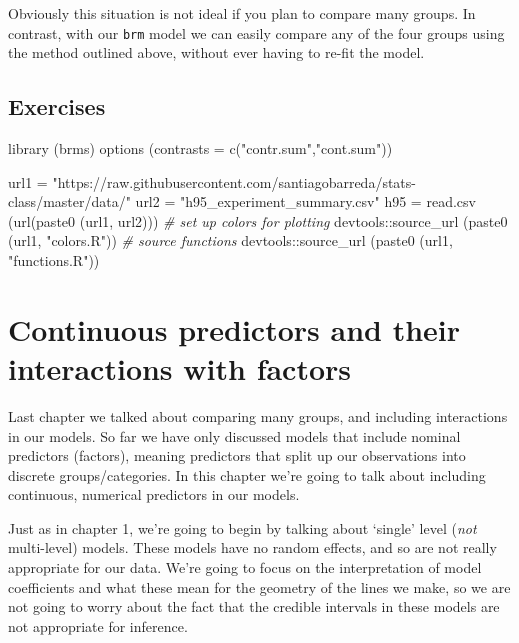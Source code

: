 \documentclass[
]{book}
\newenvironment{Shaded}{\begin{snugshade}}{\end{snugshade}}
\newcommand{\AttributeTok}[1]{\textcolor[rgb]{0.77,0.63,0.00}{#1}}
\newcommand{\CommentTok}[1]{\textcolor[rgb]{0.56,0.35,0.01}{\textit{#1}}}
\newcommand{\FunctionTok}[1]{\textcolor[rgb]{0.00,0.00,0.00}{#1}}
\newcommand{\NormalTok}[1]{#1}
\newcommand{\OtherTok}[1]{\textcolor[rgb]{0.56,0.35,0.01}{#1}}
\newcommand{\SpecialCharTok}[1]{\textcolor[rgb]{0.00,0.00,0.00}{#1}}
\newcommand{\StringTok}[1]{\textcolor[rgb]{0.31,0.60,0.02}{#1}}
\begin{document}
Obviously this situation is not ideal if you plan to compare many groups. In contrast, with our \texttt{brm} model we can easily compare any of the four groups using the method outlined above, without ever having to re-fit the model.

\hypertarget{exercises-3}{%
\section{Exercises}\label{exercises-3}}

\begin{Shaded}
\begin{Highlighting}[]
\FunctionTok{library}\NormalTok{ (brms)}
\FunctionTok{options}\NormalTok{ (}\AttributeTok{contrasts =} \FunctionTok{c}\NormalTok{(}\StringTok{"contr.sum"}\NormalTok{,}\StringTok{"cont.sum"}\NormalTok{))}

\NormalTok{url1 }\OtherTok{=} \StringTok{"https://raw.githubusercontent.com/santiagobarreda/stats{-}class/master/data/"}
\NormalTok{url2 }\OtherTok{=} \StringTok{"h95\_experiment\_summary.csv"}
\NormalTok{h95 }\OtherTok{=} \FunctionTok{read.csv}\NormalTok{ (}\FunctionTok{url}\NormalTok{(}\FunctionTok{paste0}\NormalTok{ (url1, url2)))}
\CommentTok{\# set up colors for plotting}
\NormalTok{devtools}\SpecialCharTok{::}\FunctionTok{source\_url}\NormalTok{ (}\FunctionTok{paste0}\NormalTok{ (url1, }\StringTok{"colors.R"}\NormalTok{))}
\CommentTok{\# source functions}
\NormalTok{devtools}\SpecialCharTok{::}\FunctionTok{source\_url}\NormalTok{ (}\FunctionTok{paste0}\NormalTok{ (url1, }\StringTok{"functions.R"}\NormalTok{))}
\end{Highlighting}
\end{Shaded}

\hypertarget{continuous-predictors-and-their-interactions-with-factors}{%
\chapter{Continuous predictors and their interactions with factors}\label{continuous-predictors-and-their-interactions-with-factors}}

Last chapter we talked about comparing many groups, and including interactions in our models. So far we have only discussed models that include nominal predictors (factors), meaning predictors that split up our observations into discrete groups/categories. In this chapter we're going to talk about including continuous, numerical predictors in our models.

Just as in chapter 1, we're going to begin by talking about `single' level (\emph{not} multi-level) models. These models have no random effects, and so are not really appropriate for our data. We're going to focus on the interpretation of model coefficients and what these mean for the geometry of the lines we make, so we are not going to worry about the fact that the credible intervals in these models are not appropriate for inference.
\end{document}

